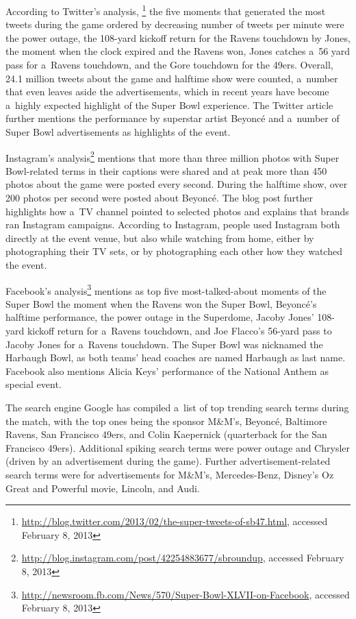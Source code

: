 According to Twitter's analysis,%
\footnote{\url{http://blog.twitter.com/2013/02/the-super-tweets-of-sb47.html},
accessed February 8, 2013}
the five moments that generated the most tweets
during the game ordered by decreasing number of tweets per minute were
the power outage,
the 108-yard kickoff return for the Ravens touchdown by Jones,
the moment when the clock expired and the Ravens won,
Jones catches a~56 yard pass for a~Ravens touchdown,
and the Gore touchdown for the 49ers.
Overall, 24.1 million tweets about the game and halftime show were counted,
a~number that even leaves aside the advertisements,
which in recent years have become a~highly expected highlight
of the Super Bowl experience.
The Twitter article further mentions the performance by superstar artist Beyoncé 
and a~number of Super Bowl advertisements as highlights of the event.   

Instagram's analysis\footnote{\url{http://blog.instagram.com/post/42254883677/sbroundup},
accessed February 8, 2013}
mentions that more than three million photos
with Super Bowl-related terms in their captions were shared and
at peak more than 450 photos about the game were posted every second.
During the halftime show, over 200 photos per second were posted about Beyoncé.
The blog post further highlights how a~TV channel pointed to selected photos
and explains that brands ran Instagram campaigns.
According to Instagram, people used Instagram both directly at the event venue,
but also while watching from home, either by photographing their TV sets,
or by photographing each other how they watched the event.

Facebook's analysis\footnote{\url{http://newsroom.fb.com/News/570/Super-Bowl-XLVII-on-Facebook},
accessed February 8, 2013}
mentions as top five most-talked-about moments of the Super Bowl 
the moment when the Ravens won the Super Bowl, 
Beyoncé's halftime performance,
the power outage in the Superdome,
Jacoby Jones' 108-yard kickoff return for a~Ravens touchdown, and
Joe Flacco’s 56-yard pass to Jacoby Jones for a~Ravens touchdown.
The Super Bowl was nicknamed the Harbaugh Bowl, as both teams' head coaches
are named Harbaugh as last name.
Facebook also mentions Alicia Keys' performance of the National Anthem as special event.

The search engine Google has compiled a~list of top trending search terms
during the match, with the top ones being the sponsor M\&M's, Beyoncé, Baltimore Ravens,
San Francisco 49ers, and Colin Kaepernick (quarterback for the San Francisco 49ers).
Additional spiking search terms were power outage
and Chrysler (driven by an advertisement during the game).
Further advertisement-related search terms were for advertisements for M\&M's,
Mercedes-Benz, Disney’s Oz Great and Powerful movie, Lincoln, and Audi.

